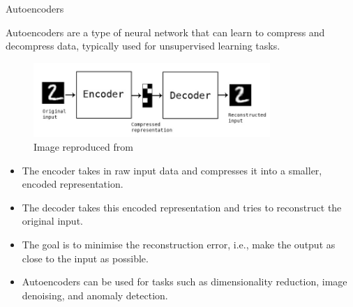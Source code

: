 %
%
%

\begin{frame}{Autoencoders}

    Autoencoders are a type of neural network that can learn to compress 
    and decompress data, typically used for unsupervised learning tasks.
    
    \begin{figure}[h]
    \centering
    \includegraphics[width=0.8\textwidth]{./images/autoencoders/autoencoder_schema.png}\\
    {\scriptsize 
    \color{col:attribution} 
    Image reproduced from \cite{KerasBlog:BuildingAutoencodersInKeras}}\\
    \end{figure}
    
    \begin{itemize}
    \item The encoder takes in raw input data and compresses it into a smaller, encoded representation.
    \item The decoder takes this encoded representation and tries to reconstruct the original input.
    \item The goal is to minimise the reconstruction error, i.e., make the output as close to the input as possible.
    \item Autoencoders can be used for tasks such as dimensionality reduction, image denoising, and anomaly detection.
    \end{itemize}
    
\end{frame}

%
%
%

